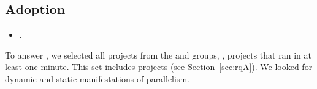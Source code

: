 





\subsection{Adoption}
\label{sec:rqC}
\label{sec:rqE}

\begin{itemize}
    \item \numRQAdoptionOne. \textbf{\RQAdoptionOne{}}
\end{itemize}

To answer \numRQAdoptionOne{}, we selected all projects from the \medg{} and
\longg{} groups, \ie, projects that ran in at least one minute.  This
set includes \numMedLong{} projects (see Section~\ref{sec:rqA}).  We
looked for dynamic and static manifestations of parallelism.

